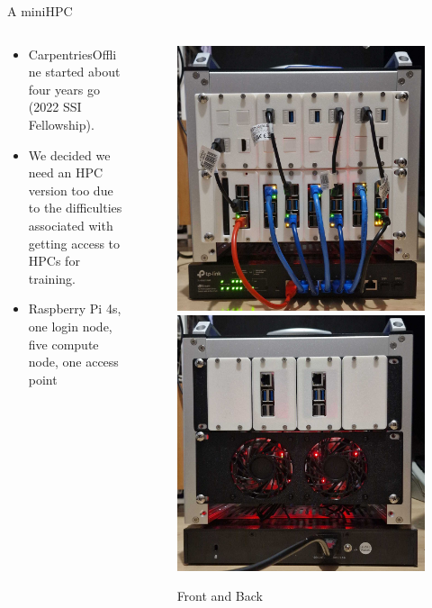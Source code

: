 \begin{frame}{A miniHPC}
	\begin{columns}[T]
		\begin{column}[c]{.6\textwidth}
			\begin{itemize}
				\item CarpentriesOffline started about four years go (2022 SSI Fellowship).
				\item We decided we need an HPC version too due to the difficulties associated with getting access to HPCs for training.
				\item Raspberry Pi 4s, one login node, five compute node, one access point
			\end{itemize}
		\end{column}
		
		\begin{column}[c]{.5\textwidth}
			\begin{figure}
				\includegraphics[width=.4\columnwidth]{images/mini-HPC-proto3.png} 
				\includegraphics[width=.4\columnwidth]{images/mini-HPC-proto3_back.png}
				\caption*{Front and Back}
			\end{figure}
		\end{column}
		
	\end{columns}
\end{frame}